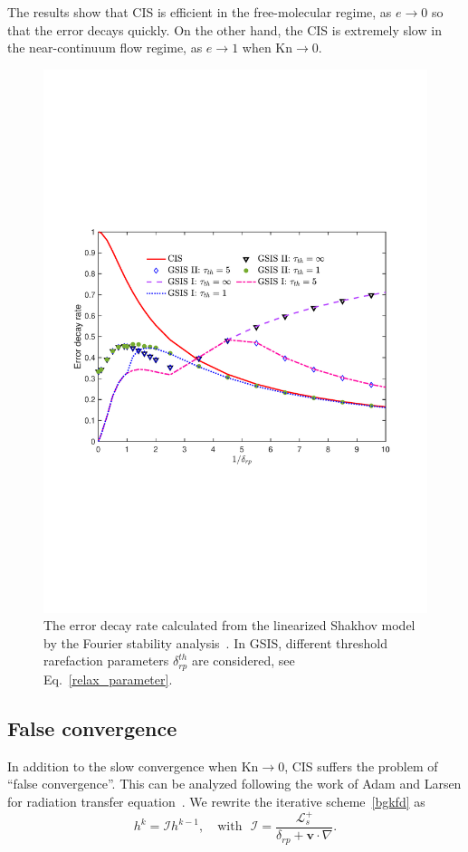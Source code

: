 The results show that CIS is efficient in the free-molecular regime, as $e\rightarrow0$ so that the error decays quickly. On the other hand, the CIS is extremely slow in the near-continuum flow regime, as $e\rightarrow1$ when $\text{Kn}\rightarrow0$. 

\begin{figure}[t]
	\centering
	\includegraphics[width=0.7\columnwidth]{GSIS/IMG/convergenceRateScheme12.pdf}
	\caption{ 
		The error decay rate calculated from the linearized Shakhov model by the Fourier stability analysis~\cite{Su2020SIAM}. In GSIS, different threshold rarefaction parameters $\delta_{rp}^{th}$ are considered, see Eq.~\eqref{relax_parameter}. 
	}
	\label{fig:SR}
\end{figure}


\subsection{False convergence}

In addition to the slow convergence when $\text{Kn}\rightarrow0$, CIS suffers the problem of ``false convergence''. This can be analyzed following the work of Adam and Larsen for radiation transfer equation~\cite{DSA2002}. We rewrite the iterative scheme~\eqref{bgkfd} as
\begin{equation}
h^k=\mathcal{I}h^{k-1}, \quad\text{with~~}
\mathcal{I}=\frac{\mathcal{L}^+_s}{\delta_{rp}+\bm{v}\cdot\nabla}.
\end{equation}


